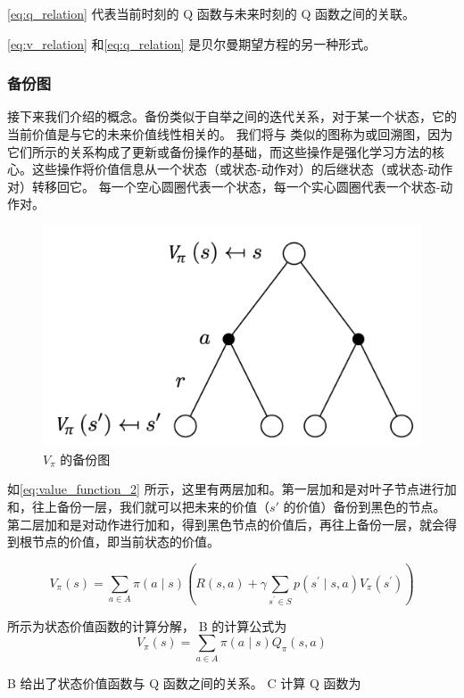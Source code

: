 \eqref{eq:q_relation} 代表当前时刻的 Q 函数与未来时刻的 Q 函数之间的关联。

\eqref{eq:v_relation} 和\eqref{eq:q_relation}  是贝尔曼期望方程的另一种形式。

\subsubsection{备份图} 

接下来我们介绍的概念。备份类似于自举之间的迭代关系，对于某一个状态，它的当前价值是与它的未来价值线性相关的。
我们将与 类似的图称为或回溯图，因为它们所示的关系构成了更新或备份操作的基础，而这些操作是强化学习方法的核心。这些操作将价值信息从一个状态（或状态-动作对）的后继状态（或状态-动作对）转移回它。
每一个空心圆圈代表一个状态，每一个实心圆圈代表一个状态-动作对。

\begin{figure}[hbt]
  \centering
  \includegraphics[width=0.3\linewidth]{res/ch2/2.25}
  \caption{$V_{\pi}$ 的备份图}
  \label{fig:fig2.25}
\end{figure}

如\eqref{eq:value_function_2} 所示，这里有两层加和。第一层加和是对叶子节点进行加和，往上备份一层，我们就可以把未来的价值（$s'$ 的价值）备份到黑色的节点。
第二层加和是对动作进行加和，得到黑色节点的价值后，再往上备份一层，就会得到根节点的价值，即当前状态的价值。

\begin{equation}
  V_{\pi}(s)=\sum_{a \in A} \pi(a \mid s)\left(R(s, a)+\gamma \sum_{s^{\prime} \in S} p\left(s^{\prime} \mid s, a\right) V_{\pi}\left(s^{\prime}\right)\right) 
  \label{eq:value_function_2}
\end{equation}

 所示为状态价值函数的计算分解，  B 的计算公式为
\begin{equation}
  V_{\pi}(s)=\sum_{a \in A} \pi(a \mid s) Q_{\pi}(s, a) 
  \label{eq:B_eq}
\end{equation}

 B 给出了状态价值函数与 Q 函数之间的关系。 C 计算 Q 函数为

